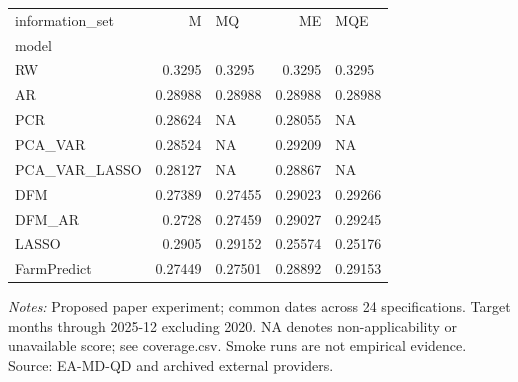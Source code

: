 \begin{threeparttable}
\begin{tabular}{lrlrl}
\toprule
information\_set & M & MQ & ME & MQE \\
model &  &  &  &  \\
\midrule
RW & 0.3295 & 0.3295 & 0.3295 & 0.3295 \\
AR & 0.28988 & 0.28988 & 0.28988 & 0.28988 \\
PCR & 0.28624 & NA & 0.28055 & NA \\
PCA\_VAR & 0.28524 & NA & 0.29209 & NA \\
PCA\_VAR\_LASSO & 0.28127 & NA & 0.28867 & NA \\
DFM & 0.27389 & 0.27455 & 0.29023 & 0.29266 \\
DFM\_AR & 0.2728 & 0.27459 & 0.29027 & 0.29245 \\
LASSO & 0.2905 & 0.29152 & 0.25574 & 0.25176 \\
FarmPredict & 0.27449 & 0.27501 & 0.28892 & 0.29153 \\
\bottomrule
\end{tabular}
\begin{tablenotes}[flushleft]\footnotesize
\item \textit{Notes:} Proposed paper experiment; common dates across 24 specifications. Target months through 2025-12 excluding 2020. NA denotes non-applicability or unavailable score; see coverage.csv. Smoke runs are not empirical evidence. Source: EA-MD-QD and archived external providers.
\end{tablenotes}
\end{threeparttable}
